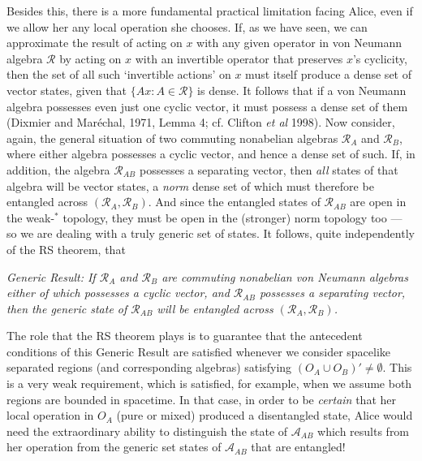 \documentclass[12pt]{article}
\newcommand{\alg}[1]{\mbox{$\mathcal{#1}$}}
\begin{document}
Besides this, there is a 
more fundamental practical limitation facing Alice, even if we allow 
her any local operation she chooses.  If, as we have seen, we can approximate  
the result of acting on $x$ with any 
given operator in von Neumann algebra $\alg{R}$ by acting on $x$ with an invertible operator that 
preserves $x$'s cyclicity, then  
the set of all such `invertible actions' on $x$ must itself produce a 
dense set of vector states, given that $\{Ax:A\in\alg{R}\}$ is dense.  It follows that if a von 
Neumann algebra possesses even just one cyclic vector, it must possess a 
dense set of them (Dixmier and 
Mar\'{e}chal, 1971, Lemma 4; cf. Clifton \emph{et 
al} 1998).  Now consider, again,
the general situation of two commuting nonabelian algebras $\alg{R}_{A}$ and 
$\alg{R}_{B}$, where either algebra possesses a cyclic vector, and hence a 
dense set of such.  If, in addition, the 
algebra $\alg{R}_{AB}$ possesses a separating vector, then 
\emph{all}
states of that algebra will be vector states, a \emph{norm} dense set of 
which must therefore be entangled across  $(\alg{R}_{A},\alg{R}_{B})$.  
And since the entangled states of $\alg{R}_{AB}$ are open in the 
weak-$^{*}$ topology, they must be open in the (stronger) norm 
topology too --- so we are dealing with a truly generic set of states. It follows, quite independently of the RS theorem, that
\begin{center}\emph{Generic Result: If $\alg{R}_{A}$ and 
$\alg{R}_{B}$ are commuting nonabelian von Neumann algebras either of 
which possesses 
a cyclic vector, and $\alg{R}_{AB}$ possesses a separating vector, 
then the generic state of $\alg{R}_{AB}$ will be entangled across 
$(\alg{R}_{A},\alg{R}_{B})$.}\end{center}
\noindent  
The role that the RS theorem plays is to guarantee that the antecedent conditions of 
this Generic Result are satisfied whenever we consider spacelike separated 
regions (and corresponding algebras) satisfying $(O_{A}\cup 
O_{B})'\not=\emptyset$.  This is a very weak requirement, which is 
satisfied, for example, when we assume both regions are bounded in 
spacetime. In that case, in order to be \emph{certain} that her 
local 
operation in $O_{A}$ (pure or mixed) produced a disentangled state, 
Alice would need the extraordinary ability to distinguish 
the state of $\alg{A}_{AB}$  which results from her operation from the 
generic set states of $\alg{A}_{AB}$  
that are entangled!   
\end{document}
